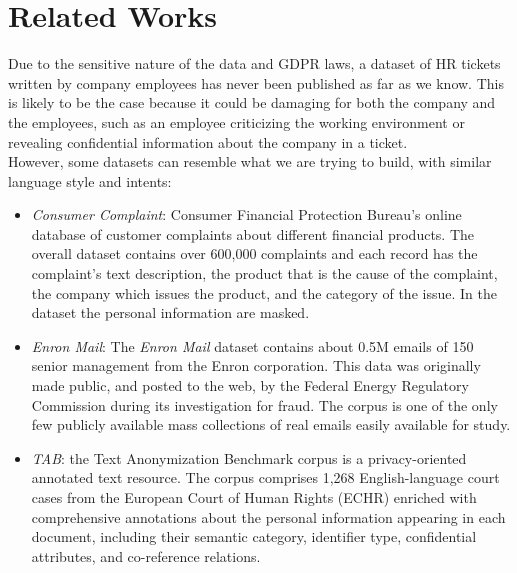 \chapter{Related Works}
\label{sec:RelatedWorks}
Due to the sensitive nature of the data and GDPR laws, a dataset of HR tickets written by company employees has never been published as far as we know. This is likely to be the case because it could be damaging for both the company and the employees, such as an employee criticizing the working environment or revealing confidential information about the company in a ticket.  \\
However, some datasets can resemble what we are trying to build, with similar language style and intents:
\begin{itemize}
    \item \textit{Consumer Complaint}: Consumer Financial Protection Bureau's online database of customer complaints about different financial products. The overall dataset contains over 600,000 complaints and each record has the complaint's text description, the product that is the cause of the complaint, the company which issues the product, and the category of the issue. In the dataset the personal information are masked.
    \item \textit{Enron Mail}: The \textit{Enron Mail} dataset contains about 0.5M emails of 150 senior management from the Enron corporation. This data was originally made public, and posted to the web, by the Federal Energy Regulatory Commission during its investigation for fraud. The corpus is one of the only few publicly available mass collections of real emails easily available for study.
    \item \textit{TAB}: the Text Anonymization Benchmark corpus\cite{pilan2022text} is a privacy-oriented annotated text resource. The corpus comprises 1,268 English-language court cases from the European Court of Human Rights (ECHR) enriched with comprehensive annotations about the personal information appearing in each document, including their semantic category, identifier type, confidential
    attributes, and co-reference relations.
\end{itemize}
